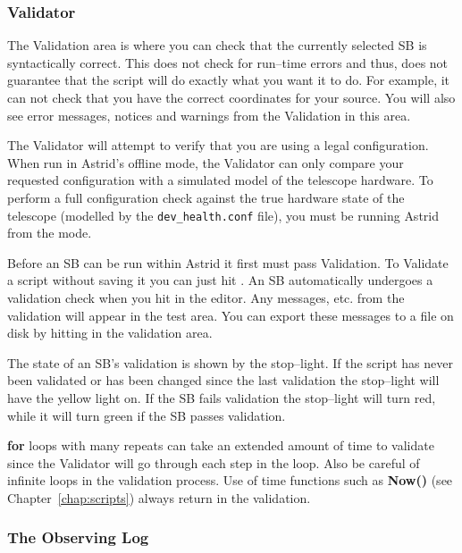 \subsubsection{Validator}\label{sec:validation}

The Validation area is where you can check that the currently selected 
\gls{SB} is syntactically correct.  This does not check for run--time errors
and thus, does not guarantee that the script will do exactly what you want it to do.
For example, it can not check that you have the correct coordinates for your source.
You will also see error messages, notices and warnings from the Validation in this area.

The Validator will attempt to verify that you are using a legal configuration.
When run in \gls{Astrid}'s offline mode, the Validator can only compare your requested
configuration with a simulated  model of the telescope hardware. To perform a
full configuration check against the true hardware state of the telescope (modelled by the
{\tt dev\_health.conf} file), you must be running \gls{Astrid} from the  mode.

Before an \gls{SB} can be run within \gls{Astrid} it first must pass Validation.  To
Validate a script without saving it you can just hit .
An \gls{SB} automatically undergoes a validation check when you hit
 in the editor.  Any messages, etc. from the
validation will appear in the  test area. You can export
these messages to a file on disk by hitting  in the
validation area.

The state of an \gls{SB}'s validation is shown by the stop--light. If the script has
never been validated or has been changed since the last validation the
stop--light will have the yellow light on.  If the \gls{SB} fails validation the
stop--light will turn red, while it will turn green if the \gls{SB} passes validation.

 {\bfseries{\textcolor{pythonKeywords}{for}}} loops with many
repeats can take an extended amount of time to validate since the Validator will
go through each step in the loop. Also be careful of infinite loops in the
validation process.  Use of time functions such as
{\bfseries{\textcolor{pythonKeywords}{Now}}()} (see Chapter~\ref{chap:scripts})
always return  in the validation.

\subsubsection{The Observing Log}

